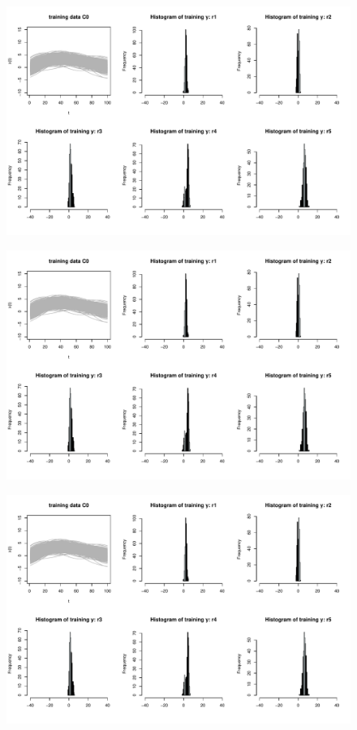 \documentclass{article}
\begin{document}
\begin{figure}[H]
    \centering
    \includegraphics[scale = 0.55, page = 6]{figs/visualize_outliers.pdf}
\end{figure}


\begin{figure}[H]
    \centering
    \includegraphics[scale = 0.55, page = 7]{figs/visualize_outliers.pdf}
\end{figure}

\begin{figure}[H]
    \includegraphics[scale = 0.55, page = 8]{figs/visualize_outliers.pdf}
\end{figure}
\end{document}
